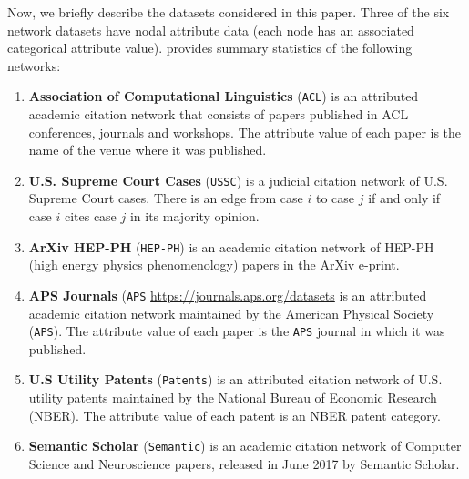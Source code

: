 Now, we briefly describe the datasets considered in this paper. Three of the six
network datasets have nodal attribute data (each node has an associated categorical attribute value).
 provides summary statistics of the following networks:
\begin{enumerate}
    \item{\textbf{Association of Computational Linguistics}} (\texttt{ACL}) \cite{acldata} is an attributed academic citation network
    that consists of papers published in ACL conferences, journals and workshops.
    The attribute value of each paper is the name of the venue where it was published.


    \item{\textbf{U.S. Supreme Court Cases}} (\texttt{USSC}) \cite{fowler2008authority} is a judicial citation network of
    U.S. Supreme Court cases. There is an edge from case $i$ to case $j$ if and only if case $i$ cites case $j$ in its majority opinion.

    \item{\textbf{ArXiv HEP-PH}} (\texttt{HEP-PH}) \cite{gehrke2003overview} is an academic citation network of HEP-PH (high energy
    physics phenomenology) papers in the ArXiv e-print.

    \item{\textbf{APS Journals}} (\texttt{APS} \url{https://journals.aps.org/datasets} is an attributed academic citation network maintained by
    the American Physical Society (\texttt{APS}).
    The attribute value of each paper is the \texttt{APS} journal in which it was published.

    \item{\textbf{U.S Utility Patents}} (\texttt{Patents}) \cite{leskovec2005graphs} is an attributed citation network of U.S. utility patents maintained by
    the National Bureau of Economic Research (NBER).
    The attribute value of each patent is an NBER patent category.

    \item{\textbf{Semantic Scholar}} (\texttt{Semantic}) \cite{ammar} is an academic citation network of
    Computer Science and Neuroscience papers, released in June 2017 by Semantic Scholar.
\end{enumerate}

